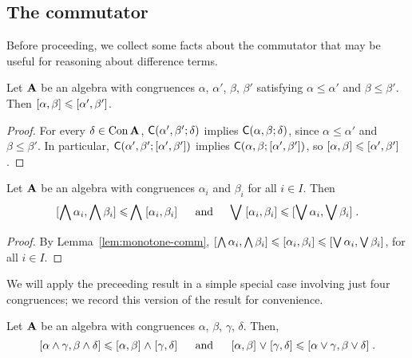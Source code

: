 \draftsecskip

\subsection{The commutator}
\label{sec:facts-about-comm}
Before proceeding, we collect some facts about the commutator that may be
useful for reasoning about difference terms.


\begin{lem}
  \label{lem:monotone-comm}
  Let $\mathbf{A}$ be an algebra
  with congruences
  $\alpha$, $\alpha'$, $\beta$, $\beta'$ satisfying
  $\alpha\leq \alpha'$ and $\beta \leq \beta'$.
  Then $\mathrel{[\alpha, \beta]} {\leqslant} \mathrel{[\alpha', \beta']}$.
\end{lem}
\begin{proof}
  For every $\delta \in \operatorname{Con}\mathbf{A}$, $\mathsf{C}(\alpha', \beta'; \delta)$ implies
  $\mathsf{C}(\alpha, \beta; \delta)$, since $\alpha\leq \alpha'$ and $\beta \leq \beta'$.
  In particular, $\mathsf{C}(\alpha', \beta'; [\alpha', \beta'])$ implies
  $\mathsf{C}(\alpha, \beta; [\alpha', \beta'])$, so
  $\mathrel{[\alpha, \beta]} {\leqslant} \mathrel{[\alpha', \beta']}$.
\end{proof}



\begin{lem}
  \label{lem:complete-meet-join-monotone}
Let $\mathbf{A}$ be an algebra with congruences
$\alpha_i$ and 
$\beta_i$ %
for all $i \in I$.
Then
\[
\mathrel{[\bigwedge \alpha_i, \bigwedge \beta_i]} {\leqslant}
\bigwedge \mathrel{[\alpha_i, \beta_i]}
\quad \text{ and } \quad
\bigvee \mathrel{[\alpha_i, \beta_i]} {\leqslant}
\mathrel{[\bigvee \alpha_i, \bigvee \beta_i]}.
\]
\end{lem}

\begin{proof}
  By Lemma~\ref{lem:monotone-comm}, $\mathrel{[\bigwedge \alpha_i, \bigwedge \beta_i]} {\leqslant}
  \mathrel{[\alpha_i, \beta_i]} {\leqslant} \mathrel{[\bigvee \alpha_i, \bigvee \beta_i]}$,
  for all $i \in I$.
\end{proof}

We will apply the preceeding result in a simple special case involving
just four congruences; we record this version of the result for convenience.
\begin{cor}
  \label{cor:facts-about-comm-1}
Let $\mathbf{A}$ be an algebra with congruences
$\alpha$, $\beta$, $\gamma$, $\delta$.  Then,
\[
\mathrel{[\alpha \wedge \gamma, \beta \wedge \delta]} {\leqslant}
\mathrel{[\alpha, \beta]} \wedge \mathrel{[\gamma, \delta]}
\quad \text{ and } \quad
\mathrel{[\alpha, \beta]} \vee \mathrel{[\gamma, \delta]} {\leqslant}
\mathrel{[\alpha \vee \gamma, \beta \vee \delta]}.
\]
\end{cor}



